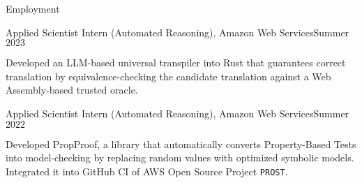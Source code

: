 \documentclass{resume} %
\begin{document}
\begin{rSection}{Employment}

  \begin{rSubsection}{Applied Scientist Intern (Automated Reasoning),
      Amazon Web Services}{Summer $2023$} {}{}
  \item Developed an LLM-based universal transpiler into Rust that
    guarantees correct translation by equivalence-checking the
    candidate translation against a Web Assembly-based trusted oracle.
  \end{rSubsection}

  \begin{rSubsection}{Applied Scientist Intern (Automated Reasoning),
      Amazon Web Services}{Summer $2022$} {}{}
  \item Developed PropProof, a library that automatically converts
    Property-Based Tests into model-checking by replacing
    random values with optimized symbolic models. Integrated it into
    GitHub CI of AWS Open Source Project \texttt{PROST}.
  \end{rSubsection}
\end{rSection}
\end{document}
